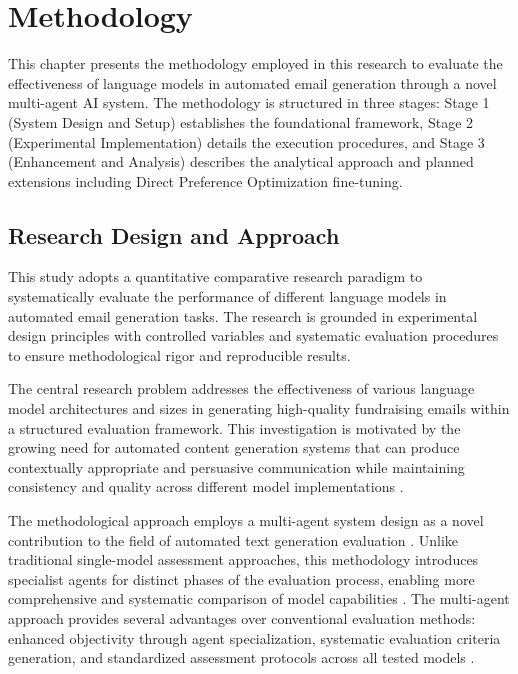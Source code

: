 \chapter{Methodology}

This chapter presents the methodology employed in this research to evaluate the effectiveness of language models in automated email generation through a novel multi-agent AI system. The methodology is structured in three stages: Stage 1 (System Design and Setup) establishes the foundational framework, Stage 2 (Experimental Implementation) details the execution procedures, and Stage 3 (Enhancement and Analysis) describes the analytical approach and planned extensions including Direct Preference Optimization fine-tuning.

\section{Research Design and Approach}
\label{sec:research-design}

This study adopts a quantitative comparative research paradigm to systematically evaluate the performance of different language models in automated email generation tasks. The research is grounded in experimental design principles with controlled variables and systematic evaluation procedures to ensure methodological rigor and reproducible results.

The central research problem addresses the effectiveness of various language model architectures and sizes in generating high-quality fundraising emails within a structured evaluation framework. This investigation is motivated by the growing need for automated content generation systems that can produce contextually appropriate and persuasive communication while maintaining consistency and quality across different model implementations \cite{murakami2023nlg_advertising, zheng2023click_controllable}.

The methodological approach employs a multi-agent system design as a novel contribution to the field of automated text generation evaluation \cite{guo2024llm_multiagent, yan2025beyond_selftalk}. Unlike traditional single-model assessment approaches, this methodology introduces specialist agents for distinct phases of the evaluation process, enabling more comprehensive and systematic comparison of model capabilities \cite{yehudai2025survey_llm_agents}. The multi-agent approach provides several advantages over conventional evaluation methods: enhanced objectivity through agent specialization, systematic evaluation criteria generation, and standardized assessment protocols across all tested models \cite{ma2024agentboard}.

